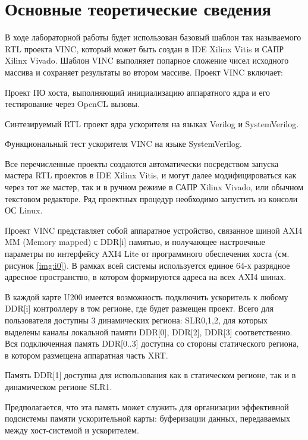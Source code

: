 \chapter*{Основные теоретические сведения}
В ходе лабораторной работы будет использован базовый шаблон так называемого RTL проекта VINC, который может быть создан в IDE Xilinx Vitis и САПР Xilinx Vivado. Шаблон VINC выполняет попарное сложение чисел исходного массива и сохраняет результаты во втором массиве. Проект VINC включает:

Проект ПО хоста, выполняющий инициализацию аппаратного ядра и его тестирование через OpenCL вызовы.

Синтезируемый RTL проект ядра ускорителя на языках Verilog и SystemVerilog.

Функциональный тест ускорителя VINC на языке SystemVerilog.

Все перечисленные проекты создаются автоматически посредством запуска мастера RTL проектов в IDE Xilinx Vitis, и могут далее модифицироваться как через тот же мастер, так и в ручном режиме в САПР Xilinx Vivado, или обычном текстовом редакторе. Ряд проектных процедур необходимо запустить из консоли ОС Linux.

Проект VINC представляет собой аппаратное устройство, связанное шиной AXI4 MM (Memory mapped) с DDR[i] памятью, и получающее настроечные параметры по интерфейсу AXI4 Lite от программного обеспечения хоста (см. рисунок \ref{img:i0}). В рамках всей системы используется единое 64-х разрядное адресное пространство, в котором формируются адреса на всех AXI4 шинах.


В каждой карте U200 имеется возможность подключить ускоритель к любому DDR[i] контроллеру в том регионе, где будет размещен проект. Всего для пользователя доступны 3 динамических региона: SLR0,1,2, для которых выделены каналы локальной памяти DDR[0], DDR[2], DDR[3] соответственно. Вся подключенная память DDR[0..3] доступна со стороны статического региона, в котором размещена аппаратная часть XRT.

Память DDR[1] доступна для использования как в статическом регионе, так и в динамическом регионе SLR1.

Предполагается, что эта память может служить для организации эффективной подсистемы памяти ускорительной карты: буферизации данных, передаваемых между хост-системой и ускорителем.